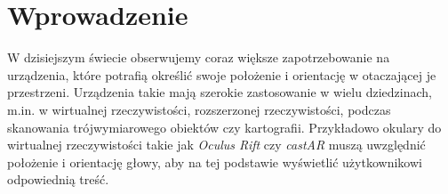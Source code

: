 
\chapter*{Wprowadzenie}

W dzisiejszym świecie obserwujemy coraz większe zapotrzebowanie na urządzenia,
które potrafią określić swoje położenie i orientację w otaczającej je przestrzeni.
Urządzenia takie mają szerokie zastosowanie w wielu dziedzinach, m.in. w
wirtualnej rzeczywistości, rozszerzonej rzeczywistości, 
 podczas skanowania trójwymiarowego obiektów czy kartografii.
Przykładowo okulary do wirtualnej rzeczywistości takie jak \textit{Oculus Rift} \cite{bib:OculusRift} 
czy \textit{castAR} \cite{bib:castAR}
muszą uwzględnić położenie i orientację głowy, aby na tej podstawie wyświetlić użytkownikowi 
odpowiednią treść. 


